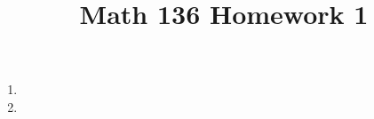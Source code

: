 \documentclass{article}
\title{Math 136 Homework 1}
\begin{document}
    \maketitle
    \begin{enumerate}
      \item 
      \item 
    \end{enumerate}
\end{document}
